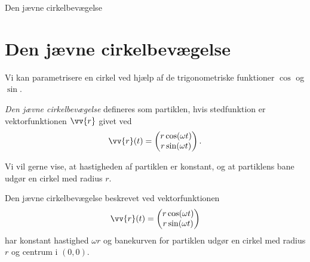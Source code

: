 
\begin{center}
	\Huge
	Den jævne cirkelbevægelse
\end{center}

\section*{Den jævne cirkelbevægelse}

Vi kan parametrisere en cirkel ved hjælp af de trigonometriske funktioner $\cos$ og $\sin$.
\begin{defn}
	\textit{Den jævne cirkelbevægelse} defineres som partiklen, hvis stedfunktion er vektorfunktionen $\vv{r}$ givet ved
	\begin{align*}
		\vv{r}(t) = 
		\begin{pmatrix}
			r\cos(\omega t) \\
			r\sin(\omega t )
		\end{pmatrix}.
	\end{align*}
\end{defn}
Vi vil gerne vise, at hastigheden af partiklen er konstant, og at partiklens bane udgør en cirkel med radius $r$. 
\begin{setn}
	Den jævne cirkelbevægelse beskrevet ved vektorfunktionen
	\begin{align*}
		\vv{r}(t) = 
		\begin{pmatrix}
			r\cos(\omega t)\\
			r\sin(\omega t)
		\end{pmatrix}		
	\end{align*}
	har konstant hastighed $\omega r$ og banekurven for partiklen udgør en cirkel med radius $r$ og centrum i $(0,0)$.
\end{setn}

